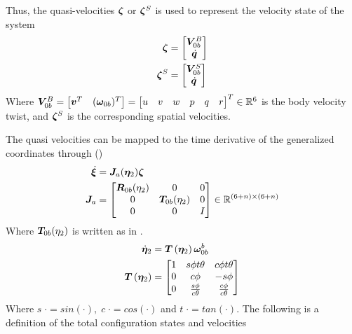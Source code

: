 Thus, the quasi-velocities $ \boldsymbol \zeta $ or $\boldsymbol \zeta^S$ is used to represent the velocity state of the system
\begin{align}
  \boldsymbol \zeta &= \begin{bmatrix} \boldsymbol V_{0b}^B \\ \dot{\boldsymbol q} \end{bmatrix}
  \label{eq:zeta1}
	\\
	\boldsymbol \zeta^S &= \begin{bmatrix} \boldsymbol V_{0b}^S \\ \dot{\boldsymbol q} \end{bmatrix}
	\label{eq:zetas}
\end{align}
Where $\boldsymbol V_{0b}^B = \begin{bmatrix} \boldsymbol v^{T} & ( \boldsymbol \omega_{0b}  )^{T} \end{bmatrix}=  \begin{bmatrix} u & v & w & p & q & r \end{bmatrix}^T \in \mathbb{R}^6 $ is the body velocity twist, and $\boldsymbol \zeta^S$ is the corresponding spatial velocities. 

The quasi velocities can be mapped to the time derivative of the generalized coordinates through (\cite{kristin_jant})
\begin{align}
 	\dot{\boldsymbol \xi} &=\boldsymbol J_a(\boldsymbol \eta_2)\boldsymbol \zeta 
  \label{eq:quasi_trans}
  \\
  \boldsymbol J_a &= \begin{bmatrix} \boldsymbol R_{0b}(\eta_2) & 0& 0 \\ 0 & \boldsymbol T_{0b}(\eta_2) & 0 \\ 0 & 0 & I \end{bmatrix} \in \mathbb{R}^{(6+n) \times (6+n) }
  \label{eq:jacobian_a}
\end{align}
Where $\boldsymbol T_{0b}(\eta_2)$ is written as in \cite{fs}.
\begin{align}
	\dot{\boldsymbol \eta}_2 & = \boldsymbol T\left( \boldsymbol \eta_{2} \right) \boldsymbol \omega_{0b}^{b} \\
	\boldsymbol T\left( \boldsymbol \eta_{2} \right) &= 
		\begin{bmatrix} 1 & s\phi t\theta & c\phi t\theta \\
										0 & c\phi & -s\phi \\
										0 & \frac{s\phi}{c\theta} & \frac{c\phi}{c\theta}
	\end{bmatrix}
	\label{eeq:fossen-transfomrm}
\end{align}
Where $s \; \cdot = sin(\cdot ), \; c \; \cdot = cos(\cdot)$ and $t \; \cdot = tan(\cdot)$. The following is a definition of the total configuration states and velocities



